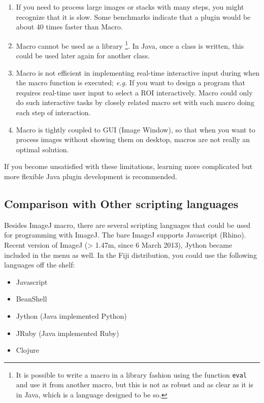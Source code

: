 \documentclass[11pt,a4paper,oneside]{report}
\newcommand{\ilcom}[1]{\texttt{\small#1}}
\begin{document}
\begin{enumerate}
\item If you need to process large images or stacks with many steps, 
you might recognize that it is slow. Some benchmarks indicate that a plugin would be about 40 times faster than Macro. 

\item Macro cannot be used as a library
  \footnote{It is possible to write a macro in a library fashion using the function \ilcom{eval} and use it from another macro, 
but this is not as robust and as clear as it is in Java, which is a language designed to be so.}. 
In Java, once a class is written, this could be used later again for another class. 

\item Macro is not efficient in implementing real-time interactive input 
during when the macro function is executed; 
\textit{e.g.} If you want to design a program that requires real-time user input 
to select a ROI interactively.  
Macro could only do such interactive tasks by closely related macro set with each macro doing each step of interaction. 

\item Macro is tightly coupled to GUI (Image Window), so that when you want to process images without showing them on desktop, macros are not really an optimal solution.
\end{enumerate}

If you become unsatisfied with these limitations, 
learning more complicated but more flexible Java plugin development is recommended. 


\subsection{Comparison with Other scripting languages}
Besides ImageJ macro, there are several scripting languages that
could be used for programming with ImageJ. The bare ImageJ supports Javascript (Rhino). Recent version of ImageJ (> 1.47m,  since 6 March 2013), Jython became included in the menu as well. 
In the Fiji distribution, you could use the following languages off the shelf:

\begin{itemize}
 \item Javascript
 \item BeanShell
 \item Jython (Java implemented Python)
 \item JRuby (Java implemented Ruby)
 \item Clojure
 \end{itemize}
\end{document}
